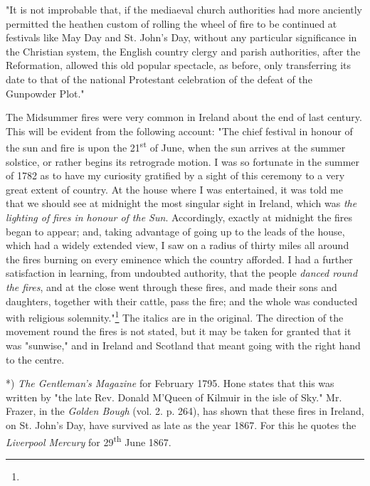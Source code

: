 \documentclass[a4paper, 11pt, oneside, polutonikogreek, english]{article}
\begin{document}
"It is not improbable that, if the mediaeval church authorities had more anciently permitted the heathen custom of rolling the wheel of fire to be continued at festivals like May Day and St. John's Day, without any particular significance in the Christian system, the English country clergy and parish authorities, after the Reformation, allowed this old popular spectacle, as before, only transferring its date to that of the national Protestant celebration of the defeat of the Gunpowder Plot."

The Midsummer fires were very common in Ireland about the end of last century. This will be evident from the following account: "The chief festival in honour of the sun and fire is upon the 21\textsuperscript{st} of June, when the sun arrives at the summer solstice, or rather begins its retrograde motion. I was so fortunate in the summer of 1782 as to have my curiosity gratified by a sight of this ceremony to a very great extent of country. At the house where I was entertained, it was told me that we should see at midnight the most singular sight in Ireland, which was \emph{the lighting of fires in honour of the Sun}. Accordingly, exactly at midnight the fires began to appear; and, taking advantage of going up to the leads of the house, which had a widely extended view, I saw on a radius of thirty miles all around the fires burning on every eminence which the country afforded. I had a further satisfaction in learning, from undoubted authority, that the people \emph{danced round the fires}, and at the close went through these fires, and made their sons and daughters, together with their cattle, pass the fire; and the whole was conducted with religious solemnity."\footnote{} The italics are in the original. The direction of the movement round the fires is not stated, but it may be taken for granted that it was "sunwise," and in Ireland and Scotland that meant going with the right hand to the centre.

*) \emph{The Gentleman's Magazine} for February 1795. Hone states that this was written by "the late Rev. Donald M'Queen of Kilmuir in the isle of Sky." Mr. Frazer, in the \emph{Golden Bough} (vol. 2. p. 264), has shown that these fires in Ireland, on St. John's Day, have survived as late as the year 1867. For this he quotes the \emph{Liverpool Mercury} for 29\textsuperscript{th} June 1867.
\end{document}
